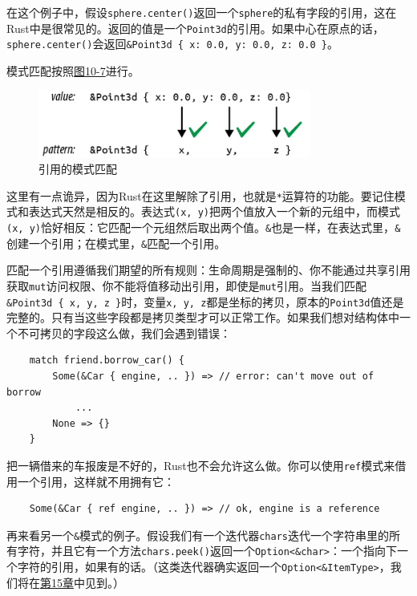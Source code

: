 在这个例子中，假设\texttt{sphere.center()}返回一个\texttt{sphere}的私有字段的引用，这在Rust中是很常见的。返回的值是一个\texttt{Point3d}的引用。如果中心在原点的话，\texttt{sphere.center()}会返回\texttt{\&Point3d \{ x: 0.0, y: 0.0, z: 0.0 \}}。

模式匹配按照\hyperref[f10-7]{图10-7}进行。

\begin{figure}[htbp]
    \centering
    \includegraphics[width=0.8\textwidth]{../img/f10-7.png}
    \caption{引用的模式匹配}
    \label{f10-7}
\end{figure}

这里有一点诡异，因为Rust在这里解除了引用，也就是\texttt{*}运算符的功能。要记住模式和表达式天然是相反的。表达式\texttt{(x, y)}把两个值放入一个新的元组中，而模式\texttt{(x, y)}恰好相反：它匹配一个元组然后取出两个值。\texttt{\&}也是一样，在表达式里，\texttt{\&}创建一个引用；在模式里，\texttt{\&}匹配一个引用。

匹配一个引用遵循我们期望的所有规则：生命周期是强制的、你不能通过共享引用获取\texttt{mut}访问权限、你不能将值移动出引用，即使是\texttt{mut}引用。当我们匹配\texttt{\&Point3d \{ x, y, z \}}时，变量\texttt{x, y, z}都是坐标的拷贝，原本的\texttt{Point3d}值还是完整的。只有当这些字段都是拷贝类型才可以正常工作。如果我们想对结构体中一个不可拷贝的字段这么做，我们会遇到错误：
\begin{verbatim}
    match friend.borrow_car() {
        Some(&Car { engine, .. }) => // error: can't move out of borrow
            ...
        None => {}
    }
\end{verbatim}

把一辆借来的车报废是不好的，Rust也不会允许这么做。你可以使用\texttt{ref}模式来借用一个引用，这样就不用拥有它：
\begin{verbatim}
    Some(&Car { ref engine, .. }) => // ok, engine is a reference
\end{verbatim}

再来看另一个\texttt{\&}模式的例子。假设我们有一个迭代器\texttt{chars}迭代一个字符串里的所有字符，并且它有一个方法\texttt{chars.peek()}返回一个\texttt{Option<\&char>}：一个指向下一个字符的引用，如果有的话。（这类迭代器确实返回一个\texttt{Option<\&ItemType>}，我们将在\hyperref[ch15]{第15章}中见到。）

